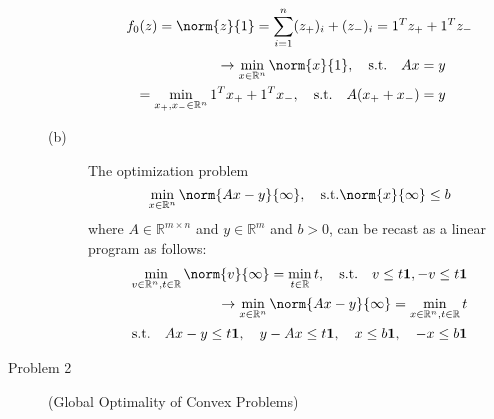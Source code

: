 \documentclass[11pt]{article}
\begin{document}
\begin{description}
\begin{description}
\begin{equation*}
    \end{equation*}
    \begin{equation*}
        f_0(z) = \norm{z}{1} = \sum_{i=1}^{n} (z_+)_i + (z_-)_i
        = 1^T z_+ + 1^T z_-
    \end{equation*}
    \begin{equation*}
        \begin{aligned}
            \rightarrow \min_{x \in \mathbb{R}^n} \norm{x}{1}, \quad \text{s.t.} \quad Ax = y &&
            \\ = \min_{x_+,x_- \in \mathbb{R}^n} 1^Tx_+ + 1^Tx_-, \quad \text{s.t.} \quad A(x_+ + x_-) = y &&
        \end{aligned}
    \end{equation*}

    \item[(b)]
    The optimization problem
    \begin{equation*}
        \min_{x \in \mathbb{R}^n} \norm{Ax-y}{\infty}, \quad \text{s.t.} \norm{x}{\infty} \leq b
    \end{equation*}
    where $A \in \mathbb{R}^{m \times n}$ and $y \in \mathbb{R}^m$ and $b>0$, can be recast as a linear program as follows:
    \begin{equation*}
        \begin{aligned}
            \min_{v \in \mathbb{R}^n, t \in \mathbb{R}}\norm{v}{\infty} = \min_{t \in \mathbb{R}} t, \quad \text{s.t.} \quad v \leq t \mathbf{1}, -v \leq t \mathbf{1} \\
            \rightarrow \min_{x \in \mathbb{R}^n} \norm{Ax-y}{\infty} = \min_{x \in \mathbb{R}^n, t \in \mathbb{R}} t\\
            \text{s.t.} \quad Ax-y \leq t \mathbf{1}, \quad y-Ax \leq t \mathbf{1}, \quad x \leq b \mathbf{1}, \quad -x \leq b \mathbf{1}
        \end{aligned}
    \end{equation*}

\end{description}

\item[Problem 2]  (Global Optimality of Convex Problems)


\end{description}
\end{document}
